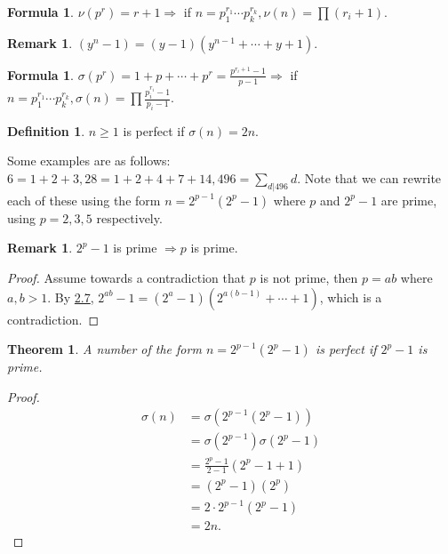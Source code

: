 \documentclass[11pt,letter]{article}
\renewcommand{\implies}{\Rightarrow}
\newcommand{\2}{\{0, 1\}}
\newcommand{\1}{\mathds{1}}
\newcounter{nLectures}
\newcounter{nTheorems}[nLectures]
\newtheorem{theorem}[nTheorems]{Theorem}
\theoremstyle{definition}
\newtheorem{definition}[nTheorems]{Definition}
\newtheorem{remark}[nTheorems]{Remark}
\newtheorem{formula}[nTheorems]{Formula}
\begin{document}
\begin{formula}
	$\nu(p^r)=r+1\implies$ if $n=p_1^{r_1}\cdots p_k^{r_k},\nu(n)=\prod(r_i+1)$.
\end{formula}

\begin{remark}\label{rem:rem_2_7}
	$(y^n-1)=(y-1)(y^{n-1}+\cdots+y+1)$.
\end{remark}

\begin{formula}
	$\sigma(p^r)=1+p+\cdots+p^r=\frac{p^{r_i+1}-1}{p-1}\implies$ if
	$n=p_1^{r_1}\cdots p_k^{r_k},\sigma(n)=\prod\frac{p_i^{r_i}-1}{p_i-1}$.
\end{formula}

\begin{definition}
	$n\geq 1$ is perfect if $\sigma(n)=2n$.
\end{definition}

Some examples are as follows: $6=1+2+3, 28=1+2+4+7+14, 496=\sum_{d\vert 496}d$. Note that we can
rewrite each of these using the form $n=2^{p-1}(2^p-1)$ where $p$ and $2^p-1$ are prime,
using $p=2,3,5$ respectively.

\begin{remark}
	$2^p-1$ is prime $\implies p$ is prime.
\end{remark}

\begin{proof}
	Assume towards a contradiction that $p$ is not prime, then $p=ab$ where $a,b>1$.
	By \hyperref[rem:rem_2_7]{2.7}, $2^{ab}-1=(2^a-1)(2^{a(b-1)}+\cdots+1)$, which is a contradiction.
\end{proof}

\begin{theorem}
	A number of the form $n=2^{p-1}(2^p-1)$ is perfect if $2^p-1$ is prime.
\end{theorem}
\begin{proof}
	\begin{align*}
		\sigma(n)&=\sigma(2^{p-1}(2^p-1)) \\
		&=\sigma(2^{p-1})\sigma(2^p-1) \\
		&=\frac{2^p-1}{2-1}(2^p-1 + 1)\\
		&=(2^p-1)(2^p)\\
		&=2\cdot2^{p-1}(2^p-1)\\
		&=2n.
	\end{align*}
\end{proof}
\end{document}
